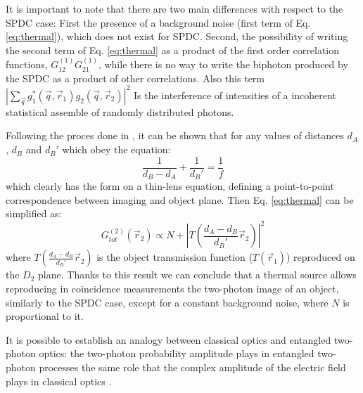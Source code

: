 It is important to note that there are two main differences with respect to the SPDC case: 
First the presence of a background noise (first term of Eq. \ref{eq:thermal}), which does not exist for SPDC. Second,
the possibility of writing the second term of Eq. \ref{eq:thermal} as a product of the first order correlation
functions, $G^{(1)}_{12}G^{(1)}_{21}$, while there is no way to write the biphoton produced by the 
SPDC as a product of other correlations. Also this term $|\sum_{\vec{q}} g_1^*(\vec{q},\vec{r}_1) g_2(\vec{q},\vec{r}_2)|^2$
Is the interference of intensities of a incoherent statistical assemble of randomly distributed photons.


Following the proces done in \cite{thermalAlejandra}, it can be shown that for any values of distances
$d_A$, $d_B$ and $d_{B}'$ which obey the equation:
\begin{equation}
\frac{1}{d_B - d_A} + \frac{1}{d_{B}'} = \frac{1}{f}
\end{equation}
which clearly has the form on a thin-lens equation, defining a point-to-point correspondence between imaging and object plane.
Then Eq. \ref{eq:thermal} can be simplified as:
\begin{equation}
G^{(2)}_{\textit{tot}}(\vec{r}_2) \propto N + | T \left( \frac{d_A - d_B}{d_{B}'} \vec{r}_2 \right) |^2
\end{equation}
where $T ( \frac{d_A - d_B}{d_{B}'} \vec{r}_2 )$ is the object transmission function ($T(\vec{r}_1)$)
reproduced on the $D_2$ plane. Thanks to this result we can conclude that a thermal source allows reproducing
in coincidence measurements the two-photon image of an object, similarly to the SPDC case, except for a 
constant background noise, where $N$ is proportional to it.


It is possible to establish an analogy
between classical optics and entangled two-photon optics:
the two-photon probability amplitude plays in entangled
two-photon processes the same role that the complex amplitude
of the electric field plays in classical optics  \cite{thermalAlejandra}.